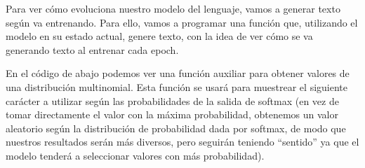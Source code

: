 \documentclass[11pt]{article}
\begin{document}
    Para ver cómo evoluciona nuestro modelo del lenguaje, vamos a generar
texto según va entrenando. Para ello, vamos a programar una función que,
utilizando el modelo en su estado actual, genere texto, con la idea de
ver cómo se va generando texto al entrenar cada 
epoch.

En el código de abajo podemos ver una función auxiliar para obtener
valores de una distribución multinomial. Esta función se usará para
muestrear el siguiente carácter a utilizar según las probabilidades de
la salida de softmax (en vez de tomar directamente el valor con la
máxima probabilidad, obtenemos un valor aleatorio según la distribución
de probabilidad dada por softmax, de modo que nuestros resultados serán
más diversos, pero seguirán teniendo ``sentido'' ya que el modelo
tenderá a seleccionar valores con más probabilidad).
\end{document}
